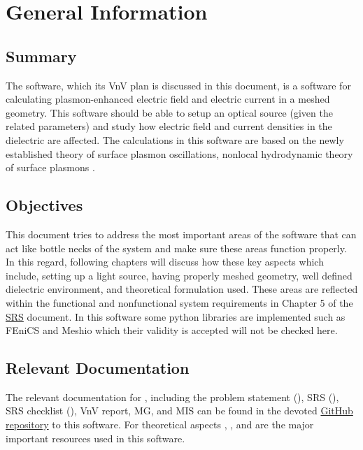 \documentclass[12pt, titlepage]{article}
\begin{document}
\section{General Information}

\subsection{Summary}

The \progname{} software, which its VnV plan is discussed in this document, is a software for calculating plasmon-enhanced electric field and electric current in a meshed geometry. This software should be able to setup an optical source (given the related parameters) and study how electric field and current densities in the dielectric are affected. The calculations in this software are based on the newly established theory of surface plasmon oscillations, nonlocal hydrodynamic theory of surface plasmons \cite{hiremath2012numerical}.   

\subsection{Objectives}
\label{obj}

This document tries to address the most important areas of the \progname{} software that can act like bottle necks of the system and make sure these areas function properly. In this regard, following chapters will discuss how these key aspects which include, setting up a light source, having properly meshed geometry, well defined dielectric environment, and theoretical formulation used. These areas are reflected within the functional and nonfunctional system requirements in Chapter 5 of the \href{https://github.com/shmouses/SPDFM/tree/master/docs/SRS}{SRS} document.  
In this software some python libraries are implemented such as FEniCS and Meshio which their validity is accepted will not be checked here. 

\subsection{Relevant Documentation}

The relevant documentation for \progname{}, including the problem statement (\cite{SPDFMdoc22:online}), SRS (\cite{SPDFMdoc90:online}), SRS checklist (\cite{BlankPro77:online}), VnV report, MG, and MIS can be found in the devoted \href{https://github.com/shmouses/SPDFM}{GitHub repository} to this software. For theoretical aspects \cite{hiremath2012numerical}, \cite{monk2003finite}, and \cite{maier2007plasmonics} are the major important resources used in this software.  
\end{document}
